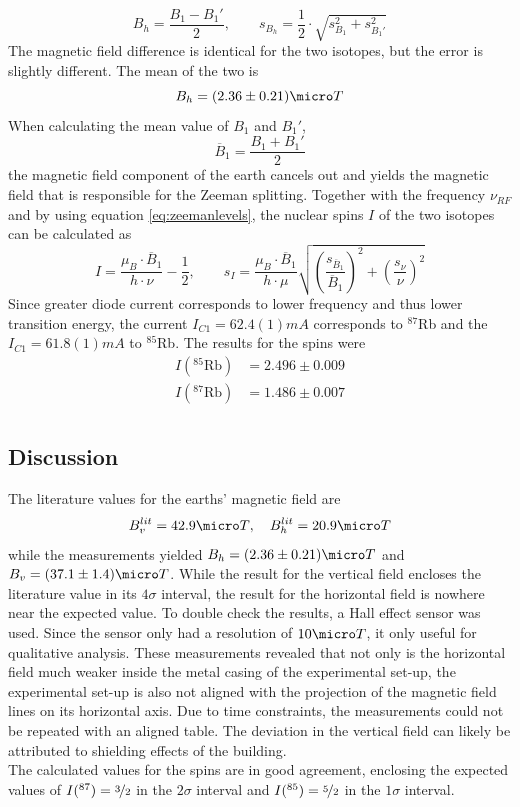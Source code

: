 \begin{equation}
B_h=\frac{B_1-B_1'}{2},\qquad s_{B_h}=\frac{1}{2}\cdot\sqrt{s_{B_1}^2+s_{B_1'}^2}
\end{equation}
The magnetic field difference is identical for the two isotopes, but the error is slightly different. The mean of the two is
\begin{equation}
B_h=\unit{(2.36\pm 0.21)}{\micro T}
\end{equation}
When calculating the mean value of $B_1$ and $B_1'$,
\begin{equation}
\overline{B}_1=\frac{B_1+B_1'}{2}
\end{equation}
the magnetic field component of the earth cancels out and yields the magnetic field that is responsible for the Zeeman splitting. Together with the frequency $\nu_{RF}$ and by using equation \ref{eq:zeemanlevels}, the nuclear spins $I$ of the two isotopes can be calculated as
\begin{equation}
I=\frac{\mu_B\cdot \overline{B}_1}{h\cdot\nu}-\frac{1}{2},\qquad s_I=\frac{\mu_B\cdot \overline{B}_1}{h\cdot\mu}
\sqrt{\left(\frac{s_{\overline{B}_1}}{\overline{B}_1}\right)^2
	+\left(\frac{s_\nu}{\nu}\right)^2}
\end{equation}
Since greater diode current corresponds to lower frequency and thus lower transition energy, the current $I_{C1}=\unit{62.4(1)}{mA}$ corresponds to $^{87}$Rb and the $I_{C1}=\unit{61.8(1)}{mA}$ to $^{85}$Rb. The results for the spins were
\begin{align}
	I(^{85}\text{Rb})&=2.496\pm0.009\\
	I(^{87}\text{Rb})&=1.486\pm0.007\\
\end{align}
\subsection{Discussion}
The literature values for the earths' magnetic field are \cite{anleitung}
\begin{equation}
B_v^{lit}=\unit{42.9}{\micro T}, \quad B_h^{lit}=\unit{20.9}{\micro T}
\end{equation}
while the measurements yielded $B_h=\unit{(2.36\pm 0.21)}{\micro T}$ and $B_v=\unit{(37.1\pm1.4)}{\micro T}$. While the result for the vertical field encloses the literature value in its $4\sigma$ interval, the result for the horizontal field is nowhere near the expected value. To double check the results, a Hall effect sensor was used. Since the sensor only had a resolution of $\unit{10}{\micro T}$, it only useful for qualitative analysis. These measurements revealed that not only is the horizontal field much weaker inside the metal casing of the experimental set-up, the experimental set-up is also not aligned with the projection of the magnetic field lines on its horizontal axis. Due to time constraints, the measurements could not be repeated with an aligned table. The deviation in the vertical field can likely be attributed to shielding effects of the building.\\

The calculated values for the spins are in good agreement, enclosing the expected values of $I(^{87})=\nicefrac{3}{2}$ in the $2\sigma$ interval and $I(^{85})=\nicefrac{5}{2}$ in the $1\sigma$ interval.
